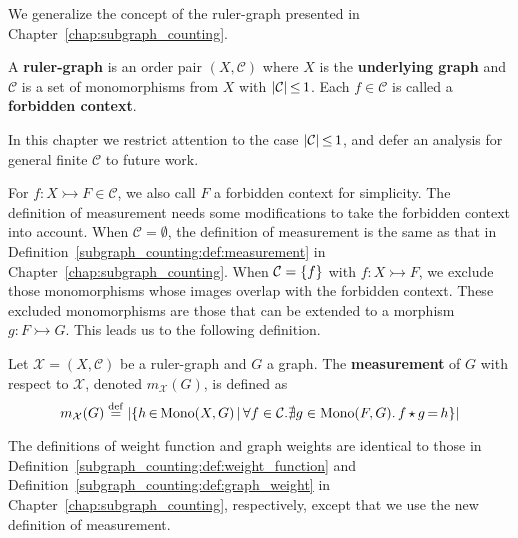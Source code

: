 We generalize the concept of the ruler-graph presented in Chapter~\ref{chap:subgraph_counting}.

\begin{definition}
    \label{antipattern:def:ruler_graph}
    A \textbf{ruler-graph} is an order pair \( (X, \mathcal{C}) \) where $X$ is the \textbf{underlying graph} and $\mathcal{C}$ is a set of monomorphisms from $X$ with $|\mathcal{C}|\mathop{\leq} 1$. Each $f \in \mathcal{C}$ is called a \textbf{forbidden context}.
\end{definition}
In this chapter we restrict attention to the case $|\mathcal{C}|\mathop{\leq} 1$, and defer an analysis for general finite $\mathcal{C}$ to future work.

For $f:X \rightarrowtail F \in \mathcal{C}$, we also call $F$ a forbidden context for simplicity.
The definition of measurement needs some modifications to take the forbidden context into account. When $\mathcal{C} \mathop{=} \emptyset$, the definition of measurement is the same as that in Definition~\ref{subgraph_counting:def:measurement} in Chapter~\ref{chap:subgraph_counting}. When $\mathcal{C} = \{f\}$ with $f:X \rightarrowtail F$, we exclude those monomorphisms whose images overlap with the forbidden context. These excluded monomorphisms are those that can be extended to a morphism $g: F \rightarrowtail G$. This leads us to the following definition.
\begin{definition} 
    \label{antipattern:def:measurement}
    Let \( \mathcal{X} = (X,\mathcal{C}) \) be a ruler-graph and \( G \) a graph. The \textbf{measurement} of \( G \) with respect to \( \mathcal{X}\), denoted \( m_\mathcal{X}(G) \), is defined as 
    \[
        m_\mathcal{X}(G) \overset{\operatorname{def}}{=} 
        |\{h \mathop{\in} \operatorname{Mono}(X,G) \mathop{\mid} \forall f \in \mathcal{C}. \nexists g\in \operatorname{Mono}(F,G).\,f \mathop{\star} g \mathop{=} h \}|
    \]
\end{definition}
The definitions of weight function and graph weights are identical to those in Definition~\ref{subgraph_counting:def:weight_function} and Definition~\ref{subgraph_counting:def:graph_weight} in Chapter~\ref{chap:subgraph_counting}, respectively, except that we use the new definition of measurement.